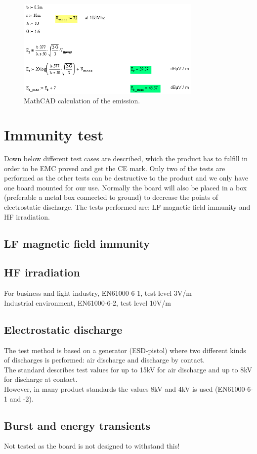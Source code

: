 \begin{figure}[H]
	\begin{centering}
		 \includegraphics[width=0.8\textwidth]{images/mathcad_emission}
		\caption{MathCAD calculation of the emission.}
	\end{centering}
\end{figure}

\section{Immunity test}
Down below different test cases are described, which the product has to fulfill in order to be EMC proved and get the CE mark. Only two of the tests are performed as the other tests can be destructive to the product and we only have one board mounted for our use. Normally the board will also be placed in a box (preferable a metal box connected to ground) to decrease the points of electrostatic discharge. The tests performed are: LF magnetic field immunity and HF irradiation.


\subsection{LF magnetic field immunity}

\subsection{HF irradiation}
For business and light industry, EN61000-6-1, test level 3V/m
\\ Industrial environment, EN61000-6-2, test level 10V/m

\subsection{Electrostatic discharge}
The test method is based on a generator (ESD-pistol) where two different kinds of discharges is performed: air discharge and discharge by contact. 
\\ The standard describes test values for up to 15kV for air discharge and up to 8kV for discharge at contact.
\\ However, in many product standards the values 8kV and 4kV is used (EN61000-6-1 and -2).


\subsection{Burst and energy transients}
Not tested as the board is not designed to withstand this!


